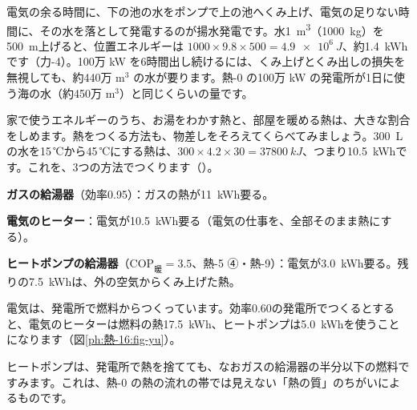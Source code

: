 電気の余る時間に、下の池の水をポンプで上の池へくみ上げ、電気の足りない時間に、その水を落として発電するのが揚水発電です。水\qty{1}{m^3}（\qty{1000}{kg}）を\qty{500}{m}上げると、位置エネルギーは $1000\times9.8\times500=\qty{4.9e6}{J}$、約\qty{1.4}{kWh}です（力-4）。100万 kW を6時間出し続けるには、くみ上げとくみ出しの損失を無視しても、約440万 m$^3$ の水が要ります。熱-0 の100万 kW の発電所が1日に使う海の水（約450万 m$^3$）と同じくらいの量です。

\leavevmode\label{ph:熱-16:sec6}家で使うエネルギーのうち、お湯をわかす熱と、部屋を暖める熱は、大きな割合をしめます。熱をつくる方法も、物差しをそろえてくらべてみましょう。\qty{300}{L}の水を15\,℃から45\,℃にする熱は、$300\times4.2\times30=\qty{37800}{kJ}$、つまり\qty{10.5}{kWh}です。これを、3つの方法でつくります（）。
\begin{enumerate}[label={\bkcircled[bkBlue]{\arabic*}}, leftmargin=2.4\zw, itemsep=1pt, topsep=2pt]
\item \textbf{ガスの給湯器}（効率0.95）：ガスの熱が\qty{11}{kWh}要る。
\item \textbf{電気のヒーター}：電気が\qty{10.5}{kWh}要る（電気の仕事を、全部そのまま熱にする）。
\item \textbf{ヒートポンプの給湯器}（$\mathrm{COP}_{\text{暖}}=3.5$、熱-5 ④・熱-9）：電気が\qty{3.0}{kWh}要る。残りの\qty{7.5}{kWh}は、外の空気からくみ上げた熱。
\end{enumerate}
電気は、発電所で燃料からつくっています。効率0.60の発電所でつくるとすると、電気のヒーターは燃料の熱\qty{17.5}{kWh}、ヒートポンプは\qty{5.0}{kWh}を使うことになります（図\ref{ph:熱-16:fig-yu}）。
\begin{bkfigure}
\label{ph:熱-16:fig-yu}
\end{bkfigure}
\noindent ヒートポンプは、発電所で熱を捨てても、なおガスの給湯器の半分以下の燃料ですみます。これは、熱-0 の熱の流れの帯では見えない「熱の質」のちがいによるものです。

